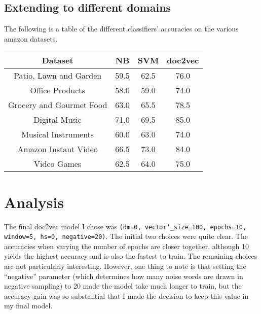 \documentclass[12pt,a4paper,twoside]{article}
\begin{document}
\vspace{16px}

\subsection{Extending to different domains}

The following is a table of the different classifiers' accuracies on the various amazon datasets.

\vspace{16px}

\begin{center}
\begin{tabular}{|c|c|c|c|}
\hline
\textbf{Dataset} & \textbf{NB} & \textbf{SVM} & \textbf{doc2vec}\\ \hline

Patio, Lawn and Garden & 59.5 & 62.5 & 76.0 \\ \hline
Office Products & 58.0 & 59.0 & 74.0 \\ \hline
Grocery and Gourmet Food & 63.0 & 65.5 & 78.5 \\ \hline
Digital Music & 71.0 & 69.5 & 85.0 \\ \hline
Musical Instruments & 60.0 & 63.0 & 74.0 \\ \hline
Amazon Instant Video & 66.5 & 73.0 & 84.0 \\ \hline
Video Games & 62.5 & 64.0 & 75.0 \\ \hline

\end{tabular}
\end{center}

\vspace{10px}

\section{Analysis}

The final doc2vec model I chose was \texttt{(dm=0, vector\char`_size=100, epochs=10, window=5, hs=0, negative=20)}. The initial two choices were quite clear. The accuracies when varying the number of epochs are closer together, although 10 yields the highest accuracy and is also the fastest to train. The remaining choices are not particularly interesting. However, one thing to note is that setting the ``negative'' parameter (which determines how many noise words are drawn in negative sampling) to 20 made the model take much longer to train, but the accuracy gain was so substantial that I made the decision to keep this value in my final model.
\end{document}
